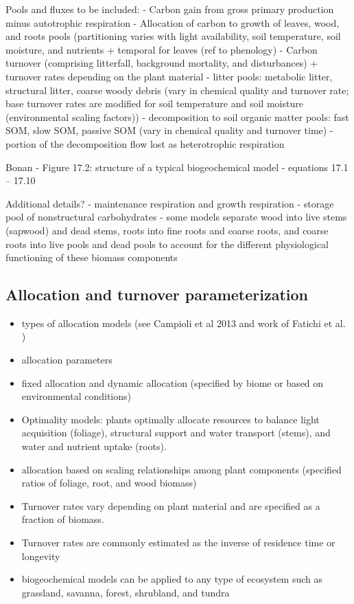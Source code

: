 \documentclass[12pt,oneside]{book}
\begin{document}
Pools and fluxes to be included: - Carbon gain from gross primary
production minus autotrophic respiration - Allocation of carbon to
growth of leaves, wood, and roots pools (partitioning varies with light
availability, soil temperature, soil moisture, and nutrients + temporal
for leaves (ref to phenology) - Carbon turnover (comprising litterfall,
background mortality, and disturbances) + turnover rates depending on
the plant material - litter pools: metabolic litter, structural litter,
coarse woody debris (vary in chemical quality and turnover rate; base
turnover rates are modified for soil temperature and soil moisture
(environmental scaling factors)) - decomposition to soil organic matter
pools: fast SOM, slow SOM, passive SOM (vary in chemical quality and
turnover time) - portion of the decomposition flow lost as heterotrophic
respiration

Bonan - Figure 17.2: structure of a typical biogeochemical model -
equations 17.1 -- 17.10

Additional details? - maintenance respiration and growth respiration -
storage pool of nonstructural carbohydrates - some models separate wood
into live stems (sapwood) and dead stems, roots into fine roots and
coarse roots, and coarse roots into live pools and dead pools to account
for the different physiological functioning of these biomass components

\subsection{Allocation and turnover
parameterization}\label{allocation-and-turnover-parameterization}

\begin{itemize}
\item
  types of allocation models (see Campioli et al 2013 and work of
  Fatichi et al. )
\item
  allocation parameters
\item
  fixed allocation and dynamic allocation (specified by biome or based
  on environmental conditions)
\item
  Optimality models: plants optimally allocate resources to balance
  light acquisition (foliage), structural support and water transport
  (stems), and water and nutrient uptake (roots).
\item
  allocation based on scaling relationships among plant components
  (specified ratios of foliage, root, and wood biomass)
\item
  Turnover rates vary depending on plant material and are specified as a
  fraction of biomass.
\item
  Turnover rates are commonly estimated as the inverse of residence time
  or longevity
\item
  biogeochemical models can be applied to any type of ecosystem such as
  grassland, savanna, forest, shrubland, and tundra
\end{itemize}
\end{document}
